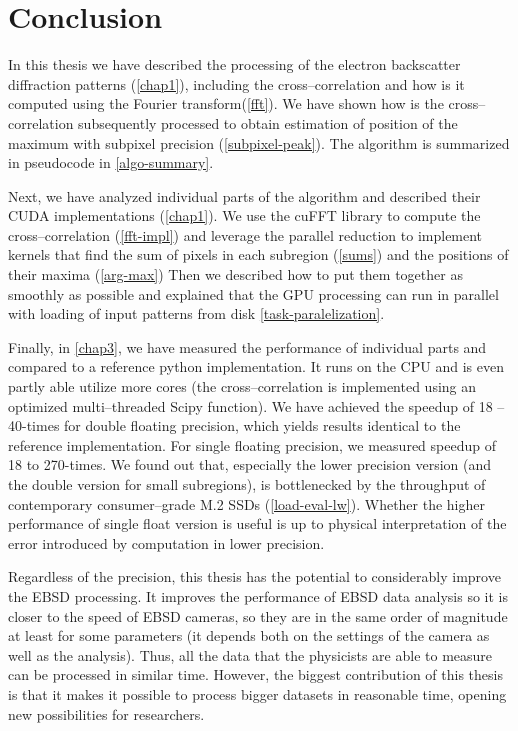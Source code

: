 \chapter*{Conclusion}

In this thesis we have described the processing of the electron backscatter diffraction patterns (\cref{chap1}), including the cross--correlation and how is it computed using the Fourier transform(\cref{fft}). We have shown how is the cross--correlation subsequently processed to obtain estimation of position of the maximum with subpixel precision (\cref{subpixel-peak}). The algorithm is summarized in pseudocode in \cref{algo-summary}.

Next, we have analyzed individual parts of the algorithm and described their CUDA implementations (\cref{chap1}). We use the cuFFT library to compute the cross--correlation (\cref{fft-impl}) and leverage the parallel reduction to implement kernels that find the sum of pixels in each subregion (\cref{sums}) and the positions of their maxima (\cref{arg-max}) Then we described how to put them together as smoothly as possible and explained that the GPU processing can run in parallel with loading of input patterns from disk {\cref{task-paralelization}}.

Finally, in \cref{chap3}, we have measured the performance of individual parts and compared to a reference python implementation. It runs on the CPU and is even partly able utilize more cores (the cross--correlation is implemented using an optimized multi--threaded Scipy function). We have achieved the speedup of 18 -- 40-times for double floating precision, which yields results identical to the reference implementation. For single floating precision, we measured speedup of 18 to 270-times. We found out that, especially the lower precision version (and the double version for small subregions), is bottlenecked by the throughput of contemporary consumer--grade M.2 SSDs (\cref{load-eval-lw}). Whether the higher performance of single float version is useful is up to physical interpretation of the error introduced by computation in lower precision.

Regardless of the precision, this thesis has the potential to considerably improve the EBSD processing. It improves the performance of EBSD data analysis so it is closer to the speed of EBSD cameras, so they are in the same order of magnitude at least for some parameters (it depends both on the settings of the camera as well as the analysis). Thus, all the data that the physicists are able to measure can be processed in similar time. However, the biggest contribution of this thesis is that it makes it possible to process bigger datasets in reasonable time, opening new possibilities for researchers.

